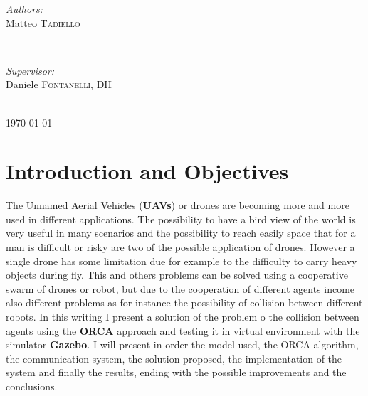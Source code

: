 \documentclass[11pt,twocolumn]{article}
\begin{document}
\begin{titlepage}

\begin{minipage}{0.4\textwidth}
\begin{flushleft} \large
\emph{Authors:}\\
Matteo \textsc{Tadiello} %
\end{flushleft}
\end{minipage}
~
\begin{minipage}{0.4\textwidth}
\begin{flushright} \large
\emph{Supervisor:} \\
Daniele \textsc{Fontanelli, DII} %
\end{flushright}
\end{minipage}\\[2cm]


{\large \today}\\[0.5cm] %



\vfill %

\end{titlepage}

\section{Introduction and Objectives}

The Unnamed Aerial Vehicles (\textbf{UAVs}) or drones are becoming more and more used in different applications. The possibility to have a bird view of the world is very useful in many scenarios and the possibility to reach easily space that for a man is difficult or risky are two of the possible application of drones. However a single drone has some limitation due for example to the difficulty to carry heavy objects during fly. This and others problems can be solved using a cooperative swarm of drones or robot, but due to the cooperation of different agents income also different problems as for instance the possibility of collision between different robots. In this writing I present a solution of the problem o the collision between agents using the \textbf{ORCA} approach and testing it in virtual environment with the simulator \textbf{Gazebo}. I will present in order the model used, the ORCA algorithm, the communication system, the solution proposed, the implementation of the system and finally the results, ending with the possible improvements and the conclusions.
\end{document}
